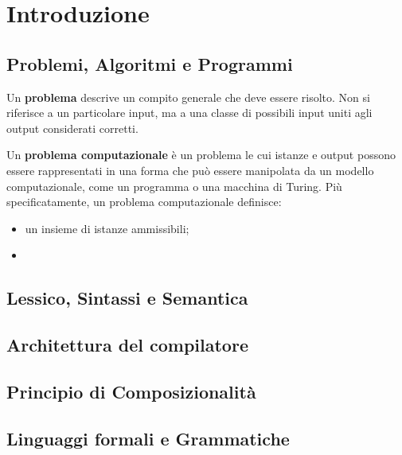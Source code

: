 \newpage
\section{Introduzione}

\subsection{Problemi, Algoritmi e Programmi}

\begin{definition}[Problema]
    Un \textbf{problema} descrive un compito generale che deve essere risolto. Non si riferisce a un particolare input, ma a una classe di possibili input uniti agli output considerati corretti.
\end{definition}

\begin{definition}
    Un \textbf{problema computazionale} è un problema le cui istanze e output possono essere rappresentati in una forma che può essere manipolata da un modello computazionale, come un programma o una macchina di Turing. Più specificatamente, un problema computazionale definisce:
    \begin{itemize}
        \item un insieme di istanze ammissibili;
        \item 
    \end{itemize}
\end{definition}



\subsection{Lessico, Sintassi e Semantica}

\subsection{Architettura del compilatore}

\subsection{Principio di Composizionalità}

\subsection{Linguaggi formali e Grammatiche}

